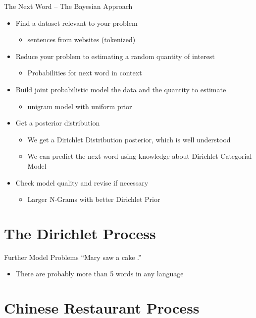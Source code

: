 \documentclass[11pt]{beamer}
\begin{document}
	\begin{frame}{The Next Word -- The Bayesian Approach}
		\centering
		\begin{itemize}
			\item Find a dataset relevant to your problem
			\begin{itemize}
				\item sentences from websites (tokenized) \checkmark
			\end{itemize}
			\item Reduce your problem to estimating a random quantity of interest
			\begin{itemize}
				\item Probabilities for next word in context \checkmark 
			\end{itemize}
			\item Build joint probabilistic model the data and the quantity to estimate
			\begin{itemize}
				\item unigram model with uniform prior \checkmark
			\end{itemize}
			\item Get a posterior distribution
			\begin{itemize}
				\item We get a Dirichlet Distribution posterior, which is well understood \checkmark
				\item We can predict the next word using knowledge about Dirichlet Categorial Model \checkmark
			\end{itemize}
			\item Check model quality and revise if necessary
			\begin{itemize}
				\item Larger N-Grams with better Dirichlet Prior \checkmark
			\end{itemize}
		\end{itemize}
	\end{frame}
	
	\section{The Dirichlet Process}
	
	\begin{frame}{Further Model Problems}
		``Mary saw a cake .''
		
		\vspace{10pt}\begin{itemize}
			\item There are probably more than 5 words in any language
		\end{itemize}
	\end{frame}
	
	\section{Chinese Restaurant Process}
	
\end{document}
